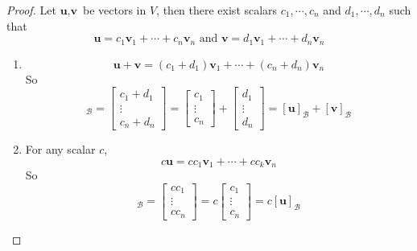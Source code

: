 \begin{proof}
	Let $\textbf{u}, \textbf{v}$ be vectors in $V$, then there exist scalars $c_1, \cdots, c_n$ and $d_1, \cdots, d_n$ such that \begin{equation*}
		\textbf{u} = c_1\textbf{v}_1 + \cdots + c_n\textbf{v}_n \mbox{ and } \textbf{v} = d_1\textbf{v}_1 + \cdots + d_n\textbf{v}_n
	\end{equation*}
	\begin{enumerate}
		\item \begin{equation*}
		\textbf{u} + \textbf{v} = (c_1 + d_1)\textbf{v}_1 + \cdots + (c_n + d_n)\textbf{v}_n
		\end{equation*} So \begin{equation*}
			[\textbf{u} + \textbf{v}]_\mathcal{B} = \begin{bmatrix}
				c_1 + d_1 \\ \vdots \\ c_n + d_n
			\end{bmatrix} = \begin{bmatrix}
				c_1 \\ \vdots \\ c_n
			\end{bmatrix} + \begin{bmatrix}
				d_1 \\ \vdots \\ d_n
			\end{bmatrix} = [\textbf{u}]_\mathcal{B} + [\textbf{v}]_\mathcal{B}
		\end{equation*}
		\item For any scalar $c$, \begin{equation*}
			c\textbf{u} = cc_1\textbf{v}_1 + \cdots + cc_k\textbf{v}_n
		\end{equation*} So \begin{equation*}
			[c\textbf{u}]_\mathcal{B} = \begin{bmatrix}
				cc_1 \\ \vdots \\ cc_n
			\end{bmatrix} = c\begin{bmatrix}
				c_1 \\ \vdots \\ c_n
			\end{bmatrix} = c[\textbf{u}]_\mathcal{B}
		\end{equation*}
	\end{enumerate}
\end{proof}

